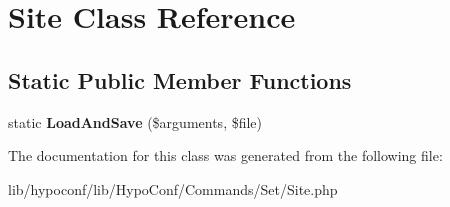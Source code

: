 \hypertarget{class_hypo_conf_1_1_commands_1_1_set_1_1_site}{
\section{\-Site \-Class \-Reference}
\label{class_hypo_conf_1_1_commands_1_1_set_1_1_site}
}
\subsection*{\-Static \-Public \-Member \-Functions}
\begin{DoxyCompactItemize}
\item 
\hypertarget{class_hypo_conf_1_1_commands_1_1_set_1_1_site_a5f8c13cc341cefb70df0b404750a5c6b}{
static {\bfseries \-Load\-And\-Save} (\$arguments, \$file)}
\label{class_hypo_conf_1_1_commands_1_1_set_1_1_site_a5f8c13cc341cefb70df0b404750a5c6b}

\end{DoxyCompactItemize}


\-The documentation for this class was generated from the following file\-:\begin{DoxyCompactItemize}
\item 
lib/hypoconf/lib/\-Hypo\-Conf/\-Commands/\-Set/\-Site.\-php\end{DoxyCompactItemize}
